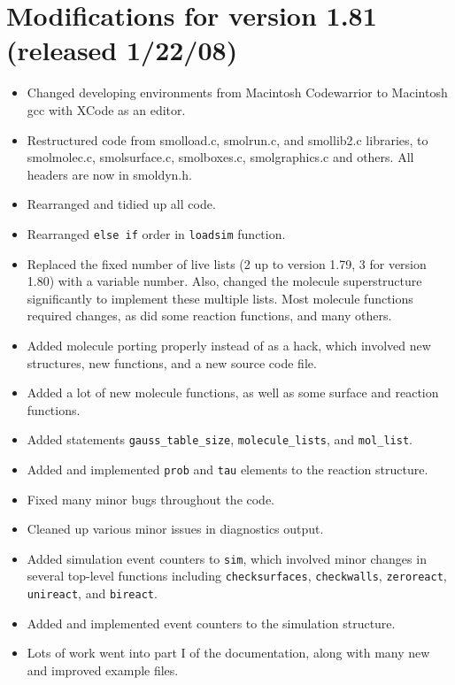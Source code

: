 \documentclass {scrbook}
\newcommand {\ttt} {\texttt}
\begin{document}
\section{Modifications for version 1.81 (released 1/22/08)}
\begin{itemize}
\item Changed developing environments from Macintosh Codewarrior to Macintosh gcc with XCode as an editor.
\item Restructured code from smolload.c, smolrun.c, and smollib2.c libraries, to smolmolec.c, smolsurface.c, smolboxes.c, smolgraphics.c and others. All headers are now in smoldyn.h.
\item Rearranged and tidied up all code.
\item Rearranged \ttt{else if} order in \ttt{loadsim} function.
\item Replaced the fixed number of live lists (2 up to version 1.79, 3 for version 1.80) with a variable number. Also, changed the molecule superstructure significantly to implement these multiple lists. Most molecule functions required changes, as did some reaction functions, and many others.
\item Added molecule porting properly instead of as a hack, which involved new structures, new functions, and a new source code file.
\item Added a lot of new molecule functions, as well as some surface and reaction functions.
\item Added statements \ttt{gauss\_table\_size}, \ttt{molecule\_lists}, and \ttt{mol\_list}.
\item Added and implemented \ttt{prob} and \ttt{tau} elements to the reaction structure.
\item Fixed many minor bugs throughout the code.
\item Cleaned up various minor issues in diagnostics output.
\item Added simulation event counters to \ttt{sim}, which involved minor changes in several top-level functions including \ttt{checksurfaces}, \ttt{checkwalls}, \ttt{zeroreact}, \ttt{unireact}, and \ttt{bireact}.
\item Added and implemented event counters to the simulation structure.
\item Lots of work went into part I of the documentation, along with many new and improved example files.
\end{itemize}
\end{document}
